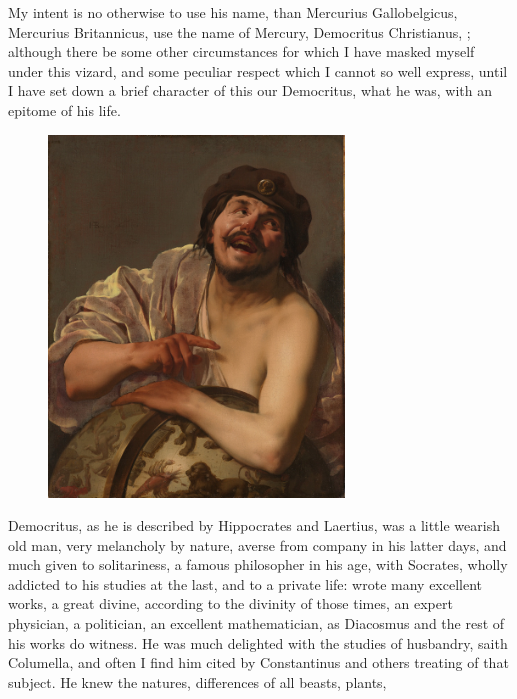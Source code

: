 {My intent is no otherwise to use his name, than Mercurius
Gallobelgicus, Mercurius Britannicus, use the name of Mercury,
Democritus Christianus, \etc; although there be some other
circumstances for which I have masked myself under this vizard, and
some peculiar respect which I cannot so well express, until I have set
down a brief character of this our Democritus, what he was, with an
epitome of his life.
\begin{figure}[H]
  \centering
  \includegraphics[keepaspectratio,width=0.7\textwidth]{figures/democritus-small.jpg}
  \caption{}
  \label{fig:democritus}
\end{figure}
Democritus, as he is described by Hippocrates and Laertius, was
a little wearish old man, very melancholy by nature, averse from
company in his latter days, and much given to solitariness, a
famous philosopher in his age,  with Socrates, wholly
addicted to his studies at the last, and to a private life: wrote many
excellent works, a great divine, according to the divinity of those
times, an expert physician, a politician, an excellent mathematician,
as Diacosmus and the rest of his works do witness. He was much
delighted with the studies of husbandry, saith Columella, and often
I find him cited by Constantinus and others treating of that
subject. He knew the natures, differences of all beasts, plants,
}
